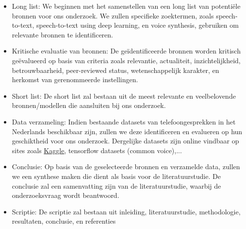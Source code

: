 \begin{itemize}
    \item Long list: We beginnen met het samenstellen van een long list van potentiële bronnen voor ons onderzoek. We zullen specifieke zoektermen, zoals speech-to-text, speech-to-text using deep learning, en voice synthesis, gebruiken om relevante bronnen te identificeren.
    \item Kritische evaluatie van bronnen: De geïdentificeerde bronnen worden kritisch geëvalueerd op basis van criteria zoals relevantie, actualiteit, inzichtelijkheid, betrouwbaarheid, peer-reviewed status, wetenschappelijk karakter, en herkomst van gerenommeerde instellingen.
    \item Short list: De short list zal bestaan uit de meest relevante en veelbelovende bronnen/modellen die aansluiten bij ons onderzoek.
    \item Data verzameling: Indien bestaande datasets van telefoongesprekken in het Nederlands beschikbaar zijn, zullen we deze identificeren en evalueren op hun geschiktheid voor ons onderzoek. Dergelijke datasets zijn online vindbaar op sites zoals \href{https://www.kaggle.com/datasets}{Kaggle}, tensorflow datasets (common voice),...
    \item Conclusie: Op basis van de geselecteerde bronnen en verzamelde data, zullen we een synthese maken die dient als basis voor de literatuurstudie. De conclusie zal een samenvatting zijn van de literatuurstudie, waarbij de onderzoeksvraag wordt beantwoord.
    \item Scriptie: De scriptie zal bestaan uit inleiding, literatuurstudie, methodologie, resultaten, conclusie, en referenties
\end{itemize}

